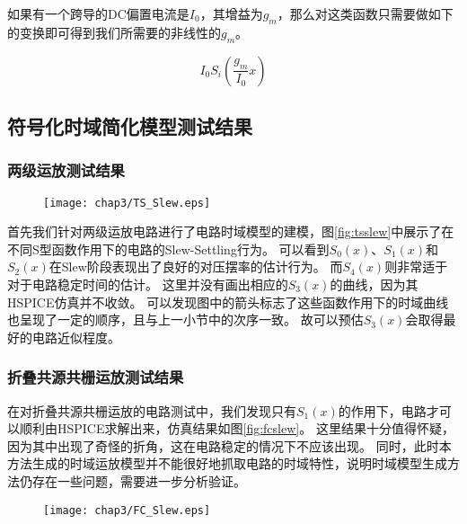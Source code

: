 如果有一个跨导的DC偏置电流是$I_0$，其增益为$g_m$，那么对这类函数只需要做如下的变换即可得到我们所需要的非线性的$g_m$。

\begin{equation}
	{I_0}{S_i}\left( {\frac{{{g_m}}}{{{I_0}}}x} \right)
\end{equation}

\subsection{符号化时域简化模型测试结果}

\subsubsection{两级运放测试结果}

\begin{figure}[!htp]
	\centering
	\texttt{[image: chap3/TS\_Slew.eps]}
\end{figure}

首先我们针对两级运放电路进行了电路时域模型的建模，图\ref{fig:tsslew}中展示了在不同S型函数作用下的电路的Slew-Settling行为。
可以看到$S_0\left(x\right)$、$S_1\left(x\right)$和$S_2\left(x\right)$在Slew阶段表现出了良好的对压摆率的估计行为。
而$S_4\left(x\right)$则非常适于对于电路稳定时间的估计。
这里并没有画出相应的$S_3\left(x\right)$的曲线，因为其HSPICE仿真并不收敛。
可以发现图中的箭头标志了这些函数作用下的时域曲线也呈现了一定的顺序，且与上一小节中的次序一致。
故可以预估$S_3\left(x\right)$会取得最好的电路近似程度。

\subsubsection{折叠共源共栅运放测试结果}

在对折叠共源共栅运放的电路测试中，我们发现只有$S_1\left(x\right)$的作用下，电路才可以顺利由HSPICE求解出来，仿真结果如图\ref{fig:fcslew}。
这里结果十分值得怀疑，因为其中出现了奇怪的折角，这在电路稳定的情况下不应该出现。
同时，此时本方法生成的时域运放模型并不能很好地抓取电路的时域特性，说明时域模型生成方法仍存在一些问题，需要进一步分析验证。

\begin{figure}[!htp]
	\centering
	\texttt{[image: chap3/FC\_Slew.eps]}
\end{figure}

